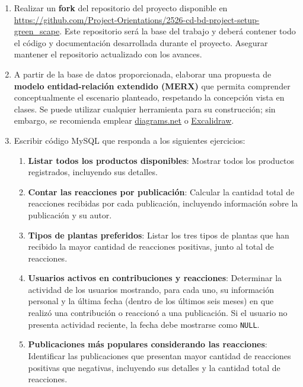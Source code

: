 \documentclass[10pt]{article}
\begin{document}
	\begin{enumerate}
		\item Realizar un \textbf{fork} del repositorio del proyecto disponible en \url{https://github.com/Project-Orientations/2526-cd-bd-project-setup-green_scape}. Este repositorio será la base del trabajo y deberá contener todo el código y documentación desarrollada durante el proyecto. Asegurar mantener el repositorio actualizado con los avances.

		\item A partir de la base de datos proporcionada, elaborar una propuesta de  \textbf{modelo entidad-relación extendido (MERX)} que permita comprender conceptualmente el escenario planteado, respetando la concepción vista en clases.
		Se puede utilizar cualquier herramienta para su construcción; sin embargo, se recomienda emplear
		\href{https://app.diagrams.net/?src=about}{diagrams.net} o
		\href{https://excalidraw.com/}{Excalidraw}.

		\item Escribir código MySQL que responda a los siguientes ejercicios:

		\begin{enumerate}
			\item \textbf{Listar todos los productos disponibles}: Mostrar todos los productos registrados, incluyendo sus detalles.

			\item \textbf{Contar las reacciones por publicación}: Calcular la cantidad total de reacciones recibidas por cada publicación, incluyendo información sobre la publicación y su autor.

			\item \textbf{Tipos de plantas preferidos}: Listar los tres tipos de plantas que han recibido la mayor cantidad de reacciones positivas, junto al total de reacciones.

			\item \textbf{Usuarios activos en contribuciones y reacciones}: Determinar la actividad de los usuarios mostrando, para cada uno, su información personal y la última fecha (dentro de los últimos seis meses) en que realizó una contribución o reaccionó a una publicación. Si el usuario no presenta actividad reciente, la fecha debe mostrarse como \texttt{NULL}.

			\item \textbf{Publicaciones más populares considerando las reacciones}: Identificar las publicaciones que presentan mayor cantidad de reacciones positivas que negativas, incluyendo sus detalles y la cantidad total de reacciones.


\end{enumerate}
\end{enumerate}
\end{document}
